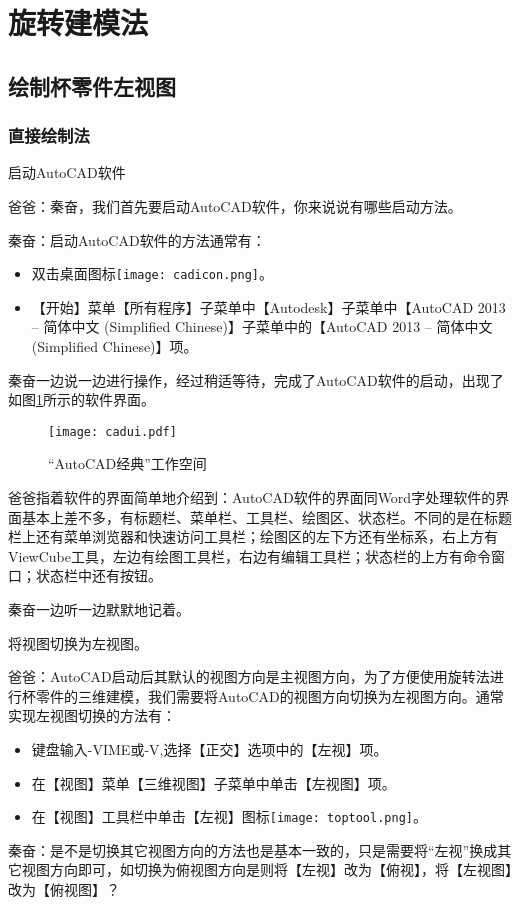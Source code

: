 \section{旋转建模法}
\subsection{绘制杯零件左视图}
\subsubsection{直接绘制法}\label{sec:beilingjianleft}
\begin{procedure}

\item 启动AutoCAD软件

爸爸：秦奋，我们首先要启动AutoCAD软件，你来说说有哪些启动方法。

秦奋：启动AutoCAD软件的方法通常有：
\begin{itemize}
\item 双击桌面图标\texttt{[image: cadicon.png]}。
\item 【开始】菜单【所有程序】子菜单中【Autodesk】子菜单中【AutoCAD 2013 – 简体中文 (Simplified Chinese)】子菜单中的【AutoCAD 2013 – 简体中文 (Simplified Chinese)】项。
\end{itemize}
秦奋一边说一边进行操作，经过稍适等待，完成了AutoCAD软件的启动，出现了如图\ref{fig:cadui}所示的软件界面。
\noindent
\begin{figure}[htbp]
\centering
\texttt{[image: cadui.pdf]}
\caption{“AutoCAD经典”工作空间}\label{fig:cadui}
\end{figure}
爸爸指着软件的界面简单地介绍到：AutoCAD软件的界面同Word字处理软件的界面基本上差不多，有标题栏、菜单栏、工具栏、绘图区、状态栏。不同的是在标题栏上还有菜单浏览器和快速访问工具栏；绘图区的左下方还有坐标系，右上方有ViewCube工具，左边有绘图工具栏，右边有编辑工具栏；状态栏的上方有命令窗口；状态栏中还有按钮。

秦奋一边听一边默默地记着。
\item 将视图切换为左视图。

爸爸：AutoCAD启动后其默认的视图方向是主视图方向，为了方便使用旋转法进行杯零件的三维建模，我们需要将AutoCAD的视图方向切换为左视图方向。通常实现左视图切换的方法有：
\begin{itemize}
\item 键盘输入-VIME或-V,选择【正交】选项中的【左视】项。
\item 在【视图】菜单【三维视图】子菜单中单击【左视图】项。
\item 在【视图】工具栏中单击【左视】图标\texttt{[image: toptool.png]}。
\end{itemize}
秦奋：是不是切换其它视图方向的方法也是基本一致的，只是需要将“左视”换成其它视图方向即可，如切换为俯视图方向是则将【左视】改为【俯视】，将【左视图】改为【俯视图】？


\end{procedure}
